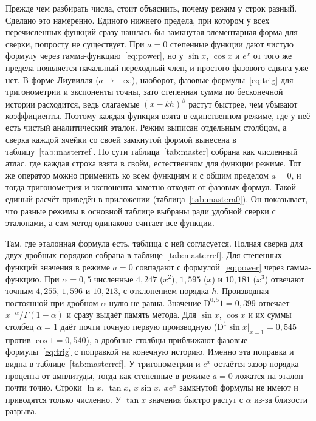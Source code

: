 \documentclass[14pt,a4paper]{extarticle}
\newcommand{\D}{\mathrm{D}}
\begin{document}
Прежде чем разбирать числа, стоит объяснить, почему режим у строк разный. Сделано это намеренно. Единого нижнего предела, при котором у всех перечисленных функций сразу нашлась бы замкнутая элементарная форма для сверки, попросту не существует. При $a=0$ степенные функции дают чистую формулу через гамма-функцию~\eqref{eq:power}, но у $\sin x$, $\cos x$ и $e^x$ от того же предела появляется начальный переходный член, и простого фазового сдвига уже нет. В форме Лиувилля ($a\to-\infty$), наоборот, фазовые формулы~\eqref{eq:trig} для тригонометрии и экспоненты точны, зато степенная сумма по бесконечной истории расходится, ведь слагаемые $(x-kh)^{\beta}$ растут быстрее, чем убывают коэффициенты. Поэтому каждая функция взята в единственном режиме, где у неё есть чистый аналитический эталон. Режим выписан отдельным столбцом, а сверка каждой ячейки со своей замкнутой формой вынесена в таблицу~\ref{tab:masterref}. По сути таблица~\ref{tab:master} собрана как численный атлас, где каждая строка взята в своём, естественном для функции режиме. Тот же оператор можно применить ко всем функциям и с общим пределом $a=0$, и тогда тригонометрия и экспонента заметно отходят от фазовых формул. Такой единый расчёт приведён в приложении (таблица~\ref{tab:mastera0}). Он показывает, что разные режимы в основной таблице выбраны ради удобной сверки с эталонами, а сам метод одинаково считает все функции.

Там, где эталонная формула есть, таблица с ней согласуется. Полная сверка для двух дробных порядков собрана в таблице~\ref{tab:masterref}. Для степенных функций значения в режиме $a=0$ совпадают с формулой~\eqref{eq:power} через гамма-функцию. При $\alpha=0{,}5$ численные $4{,}247$ ($x^2$), $1{,}595$ ($x$) и $10{,}181$ ($x^3$) отвечают точным $4{,}255$, $1{,}596$ и $10{,}213$, с отклонением порядка $h$. Производная постоянной при дробном $\alpha$ нулю не равна. Значение $\D^{0{,}5}1=0{,}399$ отвечает $x^{-\alpha}/\Gamma(1-\alpha)$ и сразу выдаёт память метода. Для $\sin x$, $\cos x$ и их суммы столбец $\alpha=1$ даёт почти точную первую производную ($\D^1\sin x|_{x=1}=0{,}545$ против $\cos 1=0{,}540$), а дробные столбцы приближают фазовые формулы~\eqref{eq:trig} с поправкой на конечную историю. Именно эта поправка и видна в таблице~\ref{tab:masterref}. У тригонометрии и $e^x$ остаётся зазор порядка процента от амплитуды, тогда как степенные в режиме $a=0$ ложатся на эталон почти точно. Строки $\ln x$, $\tan x$, $x\sin x$, $xe^x$ замкнутой формулы не имеют и приводятся только численно. У $\tan x$ значения быстро растут с $\alpha$ из-за близости разрыва.
\end{document}
